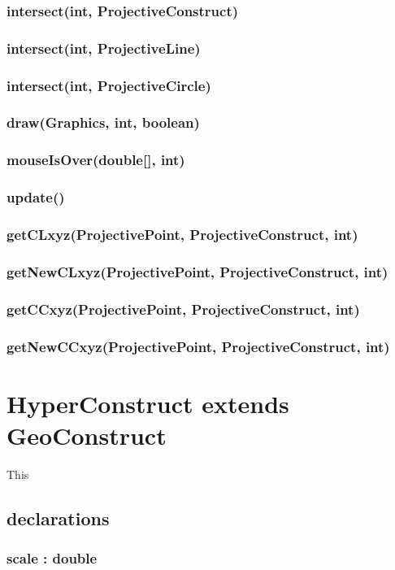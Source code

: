 \documentclass[a4paper,10pt]{report}
\begin{document}
\subsubsection{intersect(int, ProjectiveConstruct)}
\subsubsection{intersect(int, ProjectiveLine)}
\subsubsection{intersect(int, ProjectiveCircle)}
\subsubsection{draw(Graphics, int, boolean)}
\subsubsection{mouseIsOver(double[], int)}
\subsubsection{update()}
\subsubsection{getCLxyz(ProjectivePoint, ProjectiveConstruct, int)}
\subsubsection{getNewCLxyz(ProjectivePoint, ProjectiveConstruct, int)}
\subsubsection{getCCxyz(ProjectivePoint, ProjectiveConstruct, int)}
\subsubsection{getNewCCxyz(ProjectivePoint, ProjectiveConstruct, int)}
\section{HyperConstruct extends GeoConstruct} This
\subsection{declarations}
\subsubsection{scale : double}
\end{document}
